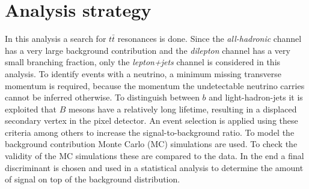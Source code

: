 \section{Analysis strategy}
\label{sec:Durchführung}
In this analysis a search for $t\bar{t}$ resonances is done. Since the \textit{all-hadronic} channel has a very large background contribution and the \textit{dilepton} channel has a very small branching fraction, only the \textit{lepton+jets} channel is considered in this analysis.
To identify events with a neutrino, a minimum missing transverse momentum is required, because the momentum the undetectable neutrino carries cannot be inferred otherwise. To distinguish between $b$ and light-hadron-jets it is exploited that $B$ mesons have a relatively long lifetime, resulting in a displaced secondary vertex in the pixel detector. An event selection is applied using these criteria among others to increase the signal-to-background ratio. To model the background contribution Monte Carlo (MC) simulations are used. To check the validity of the MC simulations these are compared to the data. In the end a final discriminant is chosen and used in a statistical analysis to determine the amount of signal on top of the background distribution.
